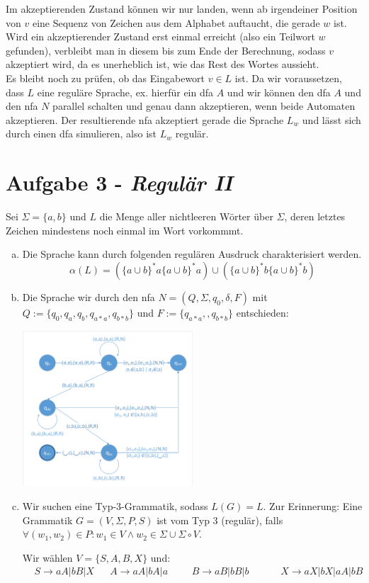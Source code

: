 \documentclass{article}
\begin{document}
Im akzeptierenden Zustand können wir nur landen, wenn ab irgendeiner Position von $v$ eine Sequenz von Zeichen aus dem Alphabet auftaucht, die gerade $w$ ist. Wird ein akzeptierender Zustand erst einmal erreicht (also ein Teilwort $w$ gefunden), verbleibt man in diesem bis zum Ende der Berechnung, sodass $v$ akzeptiert wird, da es unerheblich ist, wie das Rest des Wortes aussieht.\\

Es bleibt noch zu prüfen, ob das Eingabewort $v \in L$ ist. Da wir voraussetzen, dass $L$ eine reguläre Sprache, ex. hierfür ein dfa $A$ und wir können den dfa $A$ und den nfa $N$ parallel schalten und genau dann akzeptieren, wenn beide Automaten akzeptieren. Der resultierende nfa akzeptiert gerade die Sprache $L_w$ und lässt sich durch einen dfa simulieren, also ist $L_w$ regulär.

\section*{Aufgabe 3 - \textit{Regulär II}}
Sei $\Sigma = \{a,b\}$ und $L$ die Menge aller nichtleeren Wörter über $\Sigma$, deren letztes Zeichen mindestens noch einmal im Wort vorkommmt.
\begin{enumerate}[a)]
	\item Die Sprache kann durch folgenden regulären Ausdruck charakterisiert werden.
	\begin{equation}
		\alpha(L) = (\{a \cup b\}^* a \{a \cup b\}^* a ) \cup (\{a \cup b\}^* b \{a \cup b\}^* b )
	\end{equation}
	\item Die Sprache wir durch den nfa $N = (Q, \Sigma, q_0, \delta, F)$ mit $Q := \{q_0, q_a, q_b, q_{a*a}, q_{b*b}\}$ und $F := \{q_{a*a},, q_{b*b}\}$ entschieden:
	
	\begin{minipage}{\textwidth}
		\centering\includegraphics[width=0.5\textwidth,page=3,trim={2 2 2 4},clip]{diagramme.pdf}
	\end{minipage}
	
	\item Wir suchen eine Typ-3-Grammatik, sodass $L(G) = L$. Zur Erinnerung: Eine Grammatik $G = (V, \Sigma, P, S)$ ist vom Typ 3 (regulär), falls $\forall (w_1,w_2) \in P: w_1 \in V \land w_2 \in \Sigma \cup \Sigma \circ V$.
	
	Wir wählen $V = \{S,A,B,X\}$ und:
	\begin{align}
		&S \to aA | bB | X && A \to aA | bA | a  &&& B \to aB | bB | b  &&&&  X \to aX | bX | aA | bB
	\end{align}
\end{enumerate}
\end{document}

